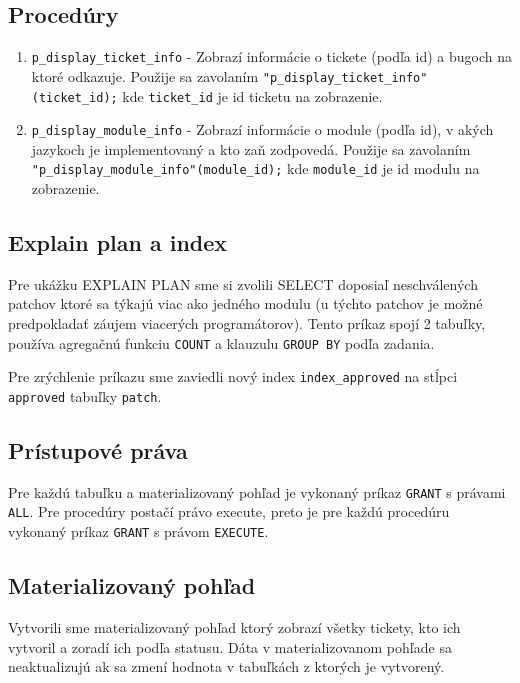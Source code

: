 \documentclass[11pt, a4paper]{article}
\begin{document}
    \subsection{Procedúry}\label{subsec:procedúry}

    \begin{enumerate}
        \item \texttt{p\_display\_ticket\_info} -
        Zobrazí informácie o tickete (podľa id) a bugoch na ktoré odkazuje.
        Použije sa zavolaním \texttt{"p\_display\_ticket\_info"(ticket\_id);} kde \texttt{ticket\_id} je id ticketu na zobrazenie.

        \item \texttt{p\_display\_module\_info} -
        Zobrazí informácie o module (podľa id), v akých jazykoch je implementovaný a kto zaň zodpovedá.
        Použije sa zavolaním \texttt{"p\_display\_module\_info"(module\_id);} kde \texttt{module\_id} je id modulu na zobrazenie.
    \end{enumerate}

    \subsection{Explain plan a index}\label{subsec:explain-plan-+-index}

    Pre ukážku EXPLAIN PLAN sme si zvolili SELECT doposiaľ neschválených patchov ktoré sa týkajú viac ako jedného modulu (u týchto patchov je možné predpokladať záujem viacerých programátorov).
    Tento príkaz spojí 2 tabuľky, používa agregačnú funkciu \texttt{COUNT} a klauzulu \texttt{GROUP BY} podľa zadania.

    Pre zrýchlenie príkazu sme zaviedli nový index \texttt{index\_approved} na stĺpci \texttt{approved} tabuľky \texttt{patch}.

    \subsection{Prístupové práva}\label{subsec:prístupové-práva}

    Pre každú tabuľku a materializovaný pohľad je vykonaný príkaz \texttt{GRANT} s právami \texttt{ALL}.
    Pre procedúry postačí právo execute, preto je pre každú procedúru vykonaný príkaz \texttt{GRANT} s právom \texttt{EXECUTE}.

    \subsection{Materializovaný pohľad}\label{subsec:materializovaný-pohľad}

    Vytvorili sme materializovaný pohľad ktorý zobrazí všetky tickety, kto ich vytvoril a zoradí ich podľa statusu.
    Dáta v materializovanom pohľade sa neaktualizujú ak sa zmení hodnota v tabuľkách z ktorých je vytvorený.
\end{document}
